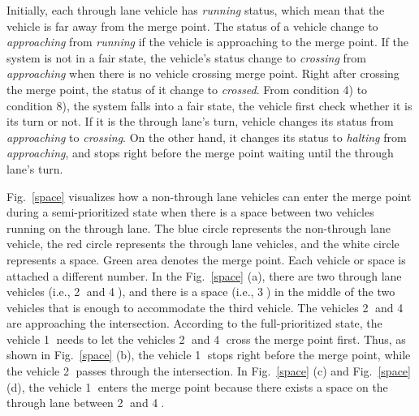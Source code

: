 \documentclass[10pt, conference, compsocconf]{IEEEtran}
\begin{document}
Initially, each through lane vehicle has \textit{running} status, which mean that the vehicle is far away from the merge point.
The status of a vehicle change to \textit{approaching} from \textit{running} if the vehicle is approaching to the merge point.
If the system is not in a fair state, the vehicle's status change to \textit{crossing} from \textit{approaching} when there is no vehicle crossing merge point. 
Right after crossing the merge point, the status of it change to \textit{crossed}. 
From condition 4) to condition 8), the system falls into a fair state, the vehicle first check whether it is its turn or not. 
If it is the through lane's turn, vehicle changes its status from \textit{approaching} to \textit{crossing}. 
On the other hand, it changes its status to \textit{halting} from \textit{approaching}, and stops right before the merge point waiting until the through lane's turn.

Fig.~\ref{space} visualizes how a non-through lane vehicles can enter the merge point during a semi-prioritized state when there is a space between two vehicles running on the through lane. 
The blue circle represents the non-through lane vehicle, the red circle represents the through lane vehicles, and the white circle represents a space. 
Green area denotes the merge point.
Each vehicle or space is attached a different number.
In the Fig.~\ref{space} (a), there are two through lane vehicles (i.e., \textcircled{2} and \textcircled{4}), and there is a space (i.e., \textcircled{3}) in the middle of the two vehicles that is enough to accommodate the third vehicle. 
The vehicles \textcircled{2} and \textcircled{4} are approaching the intersection.
According to the full-prioritized state, the vehicle \textcircled{1} needs to let the vehicles \textcircled{2} and \textcircled{4} cross the merge point first. 
Thus, as shown in Fig.~\ref{space} (b), the vehicle \textcircled{1} stops right before the merge point, while the vehicle \textcircled{2} passes through the intersection.
In Fig.~\ref{space} (c) and Fig.~\ref{space} (d), the vehicle \textcircled{1} enters the merge point because there exists a space on the through lane between \textcircled{2} and \textcircled{4}.
\end{document}
